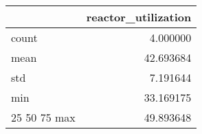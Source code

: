 \begin{tabular}{lr}
\toprule
 & reactor\_utilization \\
\midrule
count & 4.000000 \\
mean & 42.693684 \\
std & 7.191644 \\
min & 33.169175 \\
25%
50%
75%
max & 49.893648 \\
\bottomrule
\end{tabular}

